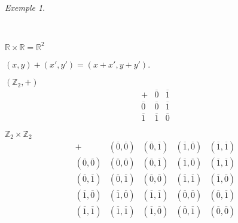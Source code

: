 \documentclass{report}
\newcommand*{\reels}{\mathbb{R}}
\newcommand*{\entiers}{\mathbb{Z}}
\theoremstyle{definition}
\theoremstyle{remark}
\newtheorem*{exem}{Exemple}
\begin{document}
	\begin{exem}
		\begin{ulist}~
			
			\item $\reels \times \reels = \reels^2$

			$(x,y)+(x',y')=(x+x',y+y')$.
			\item $(\entiers_2,+)$
			\renewcommand{\arraystretch}{1.5}
			\[
			\begin{array}{c||c|c}
				+&\overline0&\overline1\\
				\hline\hline
				\overline0&\overline0&\overline1\\
				\hline
				\overline1&\overline1&\overline0
			\end{array}
			\]

			$\entiers_2 \times \entiers_2$
			\[
			\begin{array}{c||c|c|c|c}
				+&(\overline0,\overline0)& (\overline0,\overline1)& (\overline1,\overline0)& (\overline1,\overline1)\\
				\hline\hline
				(\overline0,\overline0)& (\overline0,\overline0)& (\overline0,\overline1)& (\overline1,\overline0)& (\overline1,\overline1)\\
				\hline
				(\overline0,\overline1)& (\overline0,\overline1)& (\overline0,\overline0)& (\overline1,\overline1)& (\overline1,\overline0)\\
				\hline
				(\overline1,\overline0)& (\overline1,\overline0)& (\overline1,\overline1)& (\overline0,\overline0)& (\overline0,\overline1)\\
				\hline
				(\overline1,\overline1)& (\overline1,\overline1)& (\overline1,\overline0)& (\overline0,\overline1)& (\overline0,\overline0)
			\end{array}
			\]
			\renewcommand{\arraystretch}{1}
		\end{ulist}
	\end{exem}
\end{document}

